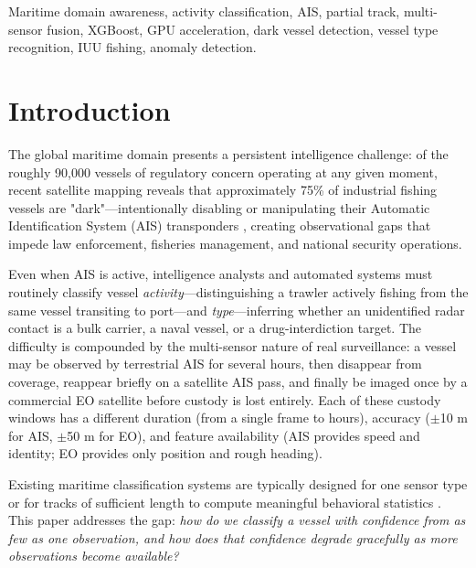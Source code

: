 \documentclass[journal]{IEEEtran}
\begin{document}
\begin{IEEEkeywords}
Maritime domain awareness, activity classification, AIS, partial track,
multi-sensor fusion, XGBoost, GPU acceleration, dark vessel detection,
vessel type recognition, IUU fishing, anomaly detection.
\end{IEEEkeywords}

\section{Introduction}
\label{sec:intro}

The global maritime domain presents a persistent intelligence challenge: of
the roughly 90,000 vessels of regulatory concern operating at any given moment,
recent satellite mapping reveals that approximately 75\% of industrial
fishing vessels are "dark"—intentionally disabling or manipulating their
Automatic Identification System (AIS) transponders \cite{paolo2024satellite, gfw_dark2022},
creating observational gaps that impede law enforcement, fisheries
management, and national security operations.

Even when AIS is active, intelligence analysts and automated systems must
routinely classify vessel \emph{activity}—distinguishing a trawler actively
fishing from the same vessel transiting to port—and \emph{type}—inferring
whether an unidentified radar contact is a bulk carrier, a naval vessel, or a
drug-interdiction target.
%
The difficulty is compounded by the multi-sensor nature of real surveillance:
a vessel may be observed by terrestrial AIS for several hours, then disappear
from coverage, reappear briefly on a satellite AIS pass, and finally be
imaged once by a commercial EO satellite before custody is lost entirely.
%
Each of these custody windows has a different duration (from a single frame to
hours), accuracy ($\pm$10 m for AIS, $\pm$50 m for EO), and feature
availability (AIS provides speed and identity; EO provides only position and
rough heading).

Existing maritime classification systems are typically designed for one sensor
type or for tracks of sufficient length to compute meaningful behavioral
statistics \cite{tu2020exploiting, perera2012maritime, mazzarella2017novel}.
%
This paper addresses the gap: \emph{how do we classify a vessel with
confidence from as few as one observation, and how does that confidence
degrade gracefully as more observations become available?}
\end{document}
